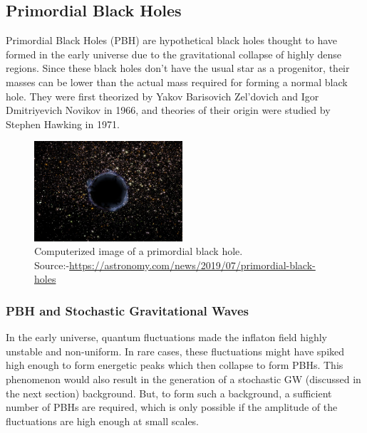 \subsection{Primordial Black Holes}
Primordial Black Holes (PBH) are hypothetical black holes thought to have formed in the early universe due to the gravitational collapse of highly dense regions. Since these black holes don't have the usual star as a progenitor, their masses can be lower than the actual mass required for forming a normal black hole. They were first theorized by Yakov Barisovich Zel'dovich and Igor Dmitriyevich Novikov in 1966, and theories of their origin were studied by Stephen Hawking in 1971. \cite{PBH_defn}

\begin{figure}
\includegraphics[width=5.5cm]{images.tex/pbh.jpg}
\caption{Computerized image of a primordial black hole.\\
    Source:-\url{https://astronomy.com/news/2019/07/primordial-black-holes}}
\end{figure} 

\subsubsection{PBH and Stochastic Gravitational Waves}
In the early universe, quantum fluctuations made the inflaton field highly unstable and non-uniform. In rare cases, these fluctuations might have spiked high enough to form energetic peaks which then collapse to form PBHs. This phenomenon would also result in the generation of a stochastic GW (discussed in the next section) background. But, to form such a background, a sufficient number of PBHs are required, which is only possible if the amplitude of the fluctuations are high enough at small scales. \cite{Nakama_2017}\\

